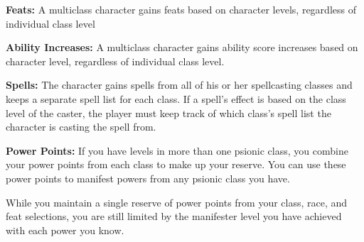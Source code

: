 \textbf{Feats:} A multiclass character gains feats based on character levels, regardless of individual class level

\textbf{Ability Increases:} A multiclass character gains ability score increases based on character level, regardless of individual class level.

\textbf{Spells:} The character gains spells from all of his or her spellcasting classes and keeps a separate spell list for each class. If a spell's effect is based on the class level of the caster, the player must keep track of which class's spell list the character is casting the spell from.

\textbf{Power Points:} If you have levels in more than one psionic class, you combine your power points from each class to make up your reserve. You can use these power points to manifest powers from any psionic class you have.

While you maintain a single reserve of power points from your class, race, and feat selections, you are still limited by the manifester level you have achieved with each power you know.
